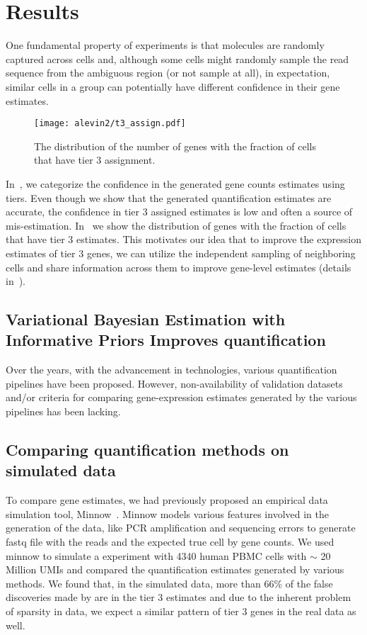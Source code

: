 \section{Results}
One fundamental property of \dscrnaseq experiments is that molecules are randomly captured across cells 
and, although some cells might randomly sample the read sequence from the ambiguous region 
(or not sample at all), in expectation, similar cells in a group can potentially have different 
confidence in their gene estimates. 

\begin{figure}[!htb]
    \centering
    \texttt{[image: alevin2/t3\_assign.pdf]}
    \caption{ The distribution of the number of genes with the fraction of cells that have tier 3
    assignment.}
    \label{fig:alv2_t3}
\end{figure}

In~, we categorize the confidence in the generated gene counts estimates using tiers. 
Even though we show that the \alevin generated quantification estimates are accurate, the confidence 
in tier 3 assigned estimates is low and often a source of mis-estimation. In~ we show the 
distribution of genes with the fraction of cells that have tier 3 estimates. This motivates our idea that to improve 
the expression estimates of tier 3 genes, we can utilize the independent sampling of neighboring cells and share 
information across them to improve gene-level estimates (details in~).

\subsection{Variational Bayesian Estimation with Informative Priors Improves \dscrnaseq quantification}
Over the years, with the advancement in \singlecell technologies, various \singlecell quantification 
pipelines have been proposed. However, non-availability of validation datasets and/or criteria for 
comparing gene-expression estimates generated by the various pipelines has been lacking. 

\subsection{Comparing quantification methods on simulated data}
\label{subsec:alv2_sims}

To compare gene estimates, we had previously proposed an empirical \dscrnaseq data simulation tool, 
Minnow~\citep{sarkar2019minnow}. Minnow models various features involved in the generation of the \dscrnaseq data, 
like PCR amplification and sequencing errors to generate fastq file with the reads and the expected true cell 
by gene counts. We used minnow to simulate a \dscrnaseq experiment with 4340 human PBMC cells with $\sim$
20 Million UMIs and compared the quantification estimates generated by various methods. We found that, 
in the simulated data, more than 66\% of the false discoveries made by \alevin are in the tier 3 estimates 
and due to the inherent problem of sparsity in \dscrnaseq data, we expect a similar pattern of tier 3 genes in 
the real data as well.

